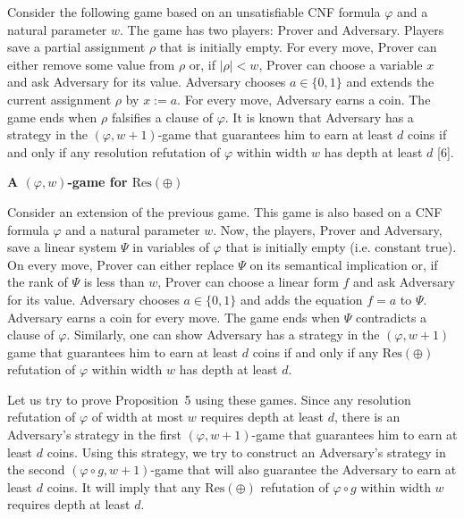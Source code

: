 \documentclass[10pt,a4paper]{article}
\begin{document}
Consider the following game based on an unsatisfiable CNF formula $\varphi$ and a natural parameter $w$. The game has two players: Prover and Adversary. Players save a partial assignment $\rho$ that is initially empty. For every move, Prover can either remove some value from $\rho$ or, if $|\rho|<w$, Prover can choose a variable $x$ and ask Adversary for its value. Adversary chooses $a\in\{0,1\}$ and extends the current assignment $\rho$ by $x:=a$. For every move, Adversary earns a coin. The game ends when $\rho$ falsifies a clause of $\varphi$. It is known that Adversary has a strategy in the $(\varphi,w+1)$-game that guarantees him to earn at least $d$ coins if and only if any resolution refutation of $\varphi$ within width $w$ has depth at least $d$ [6].\par


\par\medskip\noindent\textbf{A $(\varphi,w)$-game for $\mathrm{Res}(\oplus)$
}\par


Consider an extension of the previous game. This game is also based on a CNF formula $\varphi$ and a natural parameter $w$. Now, the players, Prover and Adversary, save a linear system $\Psi$ in variables of $\varphi$ that is initially empty (i.e. constant true). On every move, Prover can either replace $\Psi$ on its semantical implication or, if the rank of $\Psi$ is less than $w$, Prover can choose a linear form $f$ and ask Adversary for its value. Adversary chooses $a\in\{0,1\}$ and adds the equation $f=a$ to $\Psi$. Adversary earns a coin for every move. The game ends when $\Psi$ contradicts a clause of $\varphi$. Similarly, one can show Adversary has a strategy in the $(\varphi,w+1)$ game that guarantees him to earn at least $d$ coins if and only if any $\mathrm{Res}(\oplus)$ refutation of $\varphi$ within width $w$ has depth at least $d$.\par



Let us try to prove Proposition 5 using these games. Since any resolution refutation of $\varphi$ of width at most $w$ requires depth at least $d$, there is an Adversary’s strategy in the first $(\varphi,w+1)$-game that guarantees him to earn at least $d$ coins. Using this strategy, we try to construct an Adversary’s strategy in the second $(\varphi\circ g,w+1)$-game that will also guarantee the Adversary to earn at least $d$ coins. It will imply that any $\mathrm{Res}(\oplus)$ refutation of $\varphi\circ g$ within width $w$ requires depth at least $d$.\par
\end{document}
